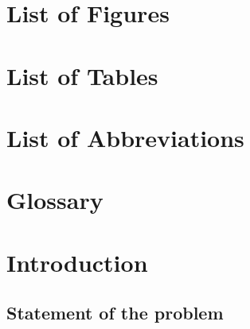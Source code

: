 \documentclass[a4paper, 12pt]{report}
\begin{document}
    \doublespacing
\tableofcontents

\pagebreak \newpage

\chapter*{List of Figures} \label{sec:figures}

    \vspace{1.5cm}
\chapter*{List of Tables} \label{sec:tables}

    \vspace{1.5cm}

\pagebreak \newpage

\chapter*{List of Abbreviations} \label{sec:abbres}


\pagebreak \newpage

\chapter*{Glossary} \label{sec:glossary}


\pagebreak \newpage
{}

\chapter{Introduction} \label{sec:introduction}

    \section*{Statement of the problem}
\end{document}
